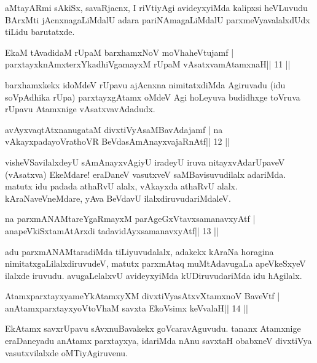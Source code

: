 \begin{artha}
aMtayARmi sAkiSx, savaRjacnx, I riVtiyAgi avideyxyiMda kalipxsi
heVLuvudu BArxMti jAcnxnagaLiMdalU adara pariNAmagaLiMdalU
parxmeVyavalalxdUdx tiLidu barutatxde.
\end{artha}

\begin{shl}
EkaM tAvadidaM rUpaM barxhamxNoV moVhaheVtujamf |
parxtayxknAmxterxYkadhiVgamayxM rUpaM vAsatxvamAtamxnaH\hfill || 11 ||
\end{shl}

\begin{artha}
barxhamxkekx idoMdeV rUpavu ajAcnxna nimitatxdiMda Agiruvadu (idu\break
soVpAdhika rUpa) parxtayxgAtamx oMdeV Agi hoLeyuva budidhxge toVruva
rUpavu Atamxnige vAsatxvavAdadudx.
\end{artha}

\begin{shl}
avAyxvaqtAtxnanugataM divxtiVyAsaMBavAdajamf |
na vAkayxpadayoVrathoVR BeVdasAmAnayxvajaRnAtf\hfill || 12 ||
\end{shl}

\begin{artha}
visheVSavilalxdeyU sAmAnayxvAgiyU iradeyU iruva nitayxvAda\break rUpaveV (vAsatxva) EkeMdare! eraDaneV vasutxveV saMBavisuvudilalx adariMda. matutx idu padada athaRvU alalx, vAkayxda athaRvU alalx. kAraNaveVneMdare, yAva BeVdavU ilalxdiruvudariMdaleV.
\end{artha}

\begin{shl}
na parxmANAMtareYgaRmayxM parAgeGxVtavxsamanavxyAtf |
anapeVkiSxtamAtArxdi tadavidAyxsamanavxyAtf\hfill || 13 ||
\end{shl}

\begin{artha}
adu parxmANAMtaradiMda tiLiyuvudalalx, adakekx kAraNa horagina nimitatxgaLilalxdiruvudeV, matutx parxmAtaq muMtAdavugaLa apeVkeSxyeV ilalxde iruvudu. avugaLelalxvU avideyxyiMda kUDiruvudariMda idu hAgilalx.
\end{artha}



\begin{shl}
AtamxparxtayxyameYkAtamxyXM divxtiVyasAtxvXtamxnoV BaveVtf |
anAtamxparxtayxyoV\s toV\s haM savxta EkoV\s simx keVvalaH\hfill || 14 ||
\end{shl}

\begin{artha}
EkAtamx savxrUpavu sAvxnuBavakekx goVcaravAguvudu. tananx Atamxnige
eraDaneyadu anAtamx parxtayxya, idariMda nAnu savxtaH obabxneV
divxtiVya vasutxvilalxde oMTiyAgiruvenu.
\end{artha}


